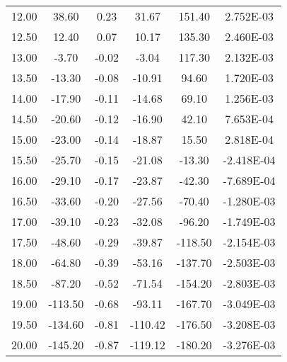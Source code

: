 \documentclass[11pt,a4j]{jsarticle}
\begin{document}
\begin{table}[htb]
\begin{center}
\begin{tabular}{cccccc}
12.00	&	38.60	&	0.23	&	31.67		&	151.40	&	2.752E-03	\\
12.50	&	12.40	&	0.07	&	10.17		&	135.30	&	2.460E-03	\\
13.00	&	-3.70	&	-0.02	&	-3.04		&	117.30	&	2.132E-03	\\
13.50	&	-13.30	&	-0.08	&	-10.91		&	94.60	&	1.720E-03	\\
14.00	&	-17.90	&	-0.11	&	-14.68		&	69.10	&	1.256E-03	\\
14.50	&	-20.60	&	-0.12	&	-16.90		&	42.10	&	7.653E-04	\\
15.00	&	-23.00	&	-0.14	&	-18.87		&	15.50	&	2.818E-04	\\
15.50	&	-25.70	&	-0.15	&	-21.08		&	-13.30	&	-2.418E-04	\\
16.00	&	-29.10	&	-0.17	&	-23.87		&	-42.30	&	-7.689E-04	\\
16.50	&	-33.60	&	-0.20	&	-27.56		&	-70.40	&	-1.280E-03	\\
17.00	&	-39.10	&	-0.23	&	-32.08		&	-96.20	&	-1.749E-03	\\
17.50	&	-48.60	&	-0.29	&	-39.87		&	-118.50	&	-2.154E-03	\\
18.00	&	-64.80	&	-0.39	&	-53.16		&	-137.70	&	-2.503E-03	\\
18.50	&	-87.20	&	-0.52	&	-71.54		&	-154.20	&	-2.803E-03	\\
19.00	&	-113.50	&	-0.68	&	-93.11		&	-167.70	&	-3.049E-03	\\
19.50	&	-134.60	&	-0.81	&	-110.42		&	-176.50	&	-3.208E-03	\\
20.00	&	-145.20	&	-0.87	&	-119.12		&	-180.20	&	-3.276E-03	\\ \bottomrule
    \end{tabular}
    \label{tab:price}
  \end{center}
\end{table}
\end{document}
